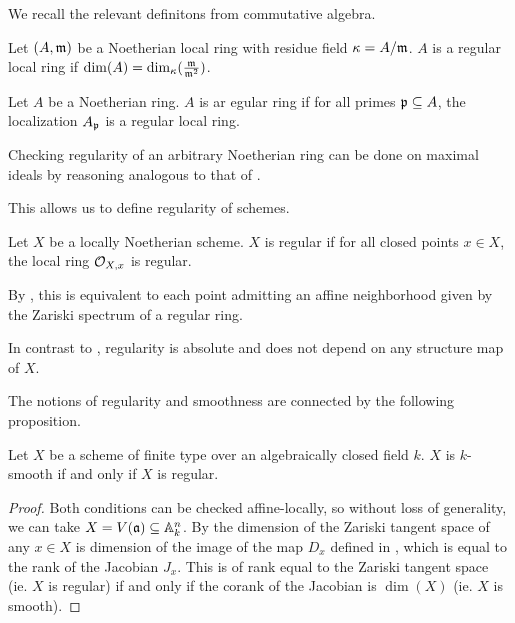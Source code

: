 We recall the relevant definitons from commutative algebra. 
\begin{definition}\label{def: regular local ring}
    Let $(A,\mathfrak{m})$ be a Noetherian local ring with residue field $\kappa=A/\mathfrak{m}$. $A$ is a regular local ring if $\dim(A)=\dim_{\kappa}(\frac{\mathfrak{m}}{\mathfrak{m}^{2}})$. 
\end{definition}
\begin{definition}\label{def: regular ring}
    Let $A$ be a Noetherian ring. $A$ is ar egular ring if for all primes $\mathfrak{p}\subseteq A$, the localization $A_{\mathfrak{p}}$ is a regular local ring. 
\end{definition}
\begin{remark}
    Checking regularity of an arbitrary Noetherian ring can be done on maximal ideals by reasoning analogous to that of . 
\end{remark}
This allows us to define regularity of schemes. 
\begin{definition}\label{def: regular scheme}
    Let $X$ be a locally Noetherian scheme. $X$ is regular if for all closed points $x\in X$, the local ring $\mathcal{O}_{X,x}$ is regular. 
\end{definition}
\begin{remark}
    By , this is equivalent to each point admitting an affine neighborhood given by the Zariski spectrum of a regular ring. 
\end{remark}
\begin{remark}
    In contrast to , regularity is absolute and does not depend on any structure map of $X$. 
\end{remark}
The notions of regularity and smoothness are connected by the following proposition. 
\begin{proposition}\label{prop: smooth iff regular alg closed}
    Let $X$ be a scheme of finite type over an algebraically closed field $k$. $X$ is $k$-smooth if and only if $X$ is regular. 
\end{proposition}
\begin{proof}
    Both conditions can be checked affine-locally, so without loss of generality, we can take $X=V(\mathfrak{a})\subseteq\mathbb{A}^{n}_{k}$. By  the dimension of the Zariski tangent space of any $x\in X$ is dimension of the image of the map $D_{x}$ defined in , which is equal to the rank of the Jacobian $J_{x}$. This is of rank equal to the Zariski tangent space (ie. $X$ is regular) if and only if the corank of the Jacobian is $\dim(X)$ (ie. $X$ is smooth). 
\end{proof}
